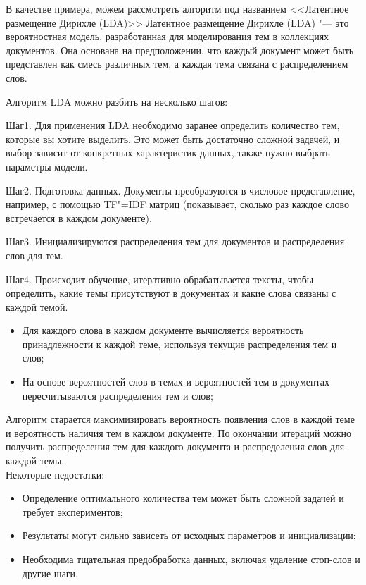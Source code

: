 \documentclass[referat]{SCWorks}
\begin{document}
В качестве примера, можем рассмотреть алгоритм под названием <<Латентное размещение Дирихле (LDA)>>
Латентное размещение Дирихле (LDA) "--- это вероятностная модель, разработанная для моделирования тем в коллекциях документов. 
Она основана на предположении, что каждый документ может быть представлен как смесь различных тем, а каждая тема связана с распределением слов.

Алгоритм LDA можно разбить на несколько шагов:

Шаг1. Для применения LDA необходимо заранее определить количество тем, которые
вы хотите выделить. Это может быть достаточно сложной задачей, и выбор зависит 
от конкретных характеристик данных, также нужно выбрать параметры модели.

Шаг2. Подготовка данных. Документы преобразуются в числовое представление, например, с помощью TF"=IDF матриц (показывает, сколько раз каждое слово встречается в каждом документе).

Шаг3. Инициализируются распределения тем для документов и распределения слов для тем.

Шаг4. Происходит обучение, итеративно обрабатывается тексты, чтобы определить, какие темы присутствуют 
в документах и какие слова связаны с каждой темой. 
\begin{itemize}
  \item Для каждого слова в каждом документе вычисляется вероятность принадлежности к каждой теме, используя текущие распределения тем и слов;
  \item На основе вероятностей слов в темах и вероятностей тем в документах пересчитываются распределения тем и слов;
\end{itemize}

Алгоритм старается максимизировать вероятность появления слов в каждой теме и вероятность наличия тем в каждом документе.
По окончании итераций можно получить распределения тем для каждого документа и распределения слов для каждой темы.\\
Некоторые недостатки:
\begin{itemize}
  \item Определение оптимального количества тем может быть сложной задачей и требует экспериментов;
  \item Результаты могут сильно зависеть от исходных параметров и инициализации;
  \item Необходима тщательная предобработка данных, включая удаление стоп-слов и другие шаги.
\end{itemize}
\end{document}
